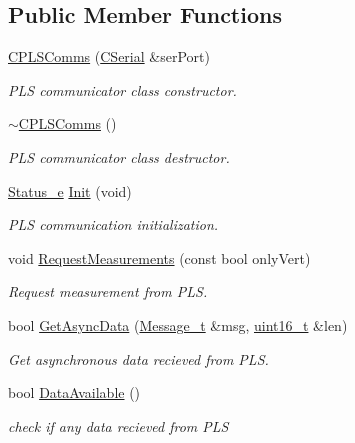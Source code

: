 \subsection*{Public Member Functions}
\begin{DoxyCompactItemize}
\item 
\mbox{\hyperlink{class_c_p_l_s_comms_ae1ec975e5e402b405389d47b8acd0a63}{C\+P\+L\+S\+Comms}} (\mbox{\hyperlink{class_c_serial}{C\+Serial}} \&ser\+Port)
\begin{DoxyCompactList}\small\item\em P\+LS communicator class constructor. \end{DoxyCompactList}\item 
\mbox{\hyperlink{class_c_p_l_s_comms_aac23966ff823f63a2ff524bbb706e549}{$\sim$\+C\+P\+L\+S\+Comms}} ()
\begin{DoxyCompactList}\small\item\em P\+LS communicator class destructor. \end{DoxyCompactList}\item 
\mbox{\hyperlink{class_c_p_l_s_comms_a765bc36363f75f4faf4fd2b41d440159}{Status\+\_\+e}} \mbox{\hyperlink{class_c_p_l_s_comms_ae7f8d87ea15de35a120d65a7a8bbbb76}{Init}} (void)
\begin{DoxyCompactList}\small\item\em P\+LS communication initialization. \end{DoxyCompactList}\item 
void \mbox{\hyperlink{class_c_p_l_s_comms_ab69a49f5c4cd7b4b9f63fa16c7792920}{Request\+Measurements}} (const bool only\+Vert)
\begin{DoxyCompactList}\small\item\em Request measurement from P\+LS. \end{DoxyCompactList}\item 
bool \mbox{\hyperlink{class_c_p_l_s_comms_a3124eaa4549706962c7024c7c97e82b0}{Get\+Async\+Data}} (\mbox{\hyperlink{struct_c_p_l_s_comms_1_1_message__t}{Message\+\_\+t}} \&msg, \mbox{\hyperlink{_a_d_a_s___types_8h_a1f1825b69244eb3ad2c7165ddc99c956}{uint16\+\_\+t}} \&len)
\begin{DoxyCompactList}\small\item\em Get asynchronous data recieved from P\+LS. \end{DoxyCompactList}\item 
bool \mbox{\hyperlink{class_c_p_l_s_comms_ae9d000eff184034954829d76162654a5}{Data\+Available}} ()
\begin{DoxyCompactList}\small\item\em check if any data recieved from P\+LS \end{DoxyCompactList}\item 

\end{DoxyCompactItemize}
